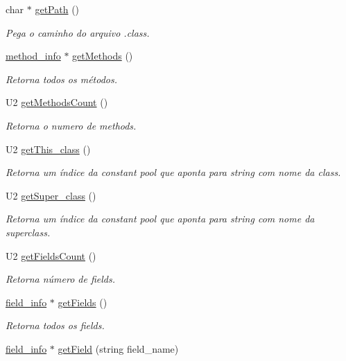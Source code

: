 \begin{DoxyCompactItemize}
char $\ast$ \hyperlink{classLeitor_a28757ad7042926102520d2f28387acfe}{get\+Path} ()
\begin{DoxyCompactList}\small\item\em Pega o caminho do arquivo .class. \end{DoxyCompactList}\item 
\hyperlink{structmethod__info}{method\+\_\+info} $\ast$ \hyperlink{classLeitor_aa08c48544276f3c849eb138576d9f1b3}{get\+Methods} ()
\begin{DoxyCompactList}\small\item\em Retorna todos os métodos. \end{DoxyCompactList}\item 
U2 \hyperlink{classLeitor_a1bf5bcc94ae930802de39077836d6566}{get\+Methods\+Count} ()
\begin{DoxyCompactList}\small\item\em Retorna o numero de methods. \end{DoxyCompactList}\item 
U2 \hyperlink{classLeitor_a96d06888c1e8d4a6516c5e5f36d49801}{get\+This\+\_\+class} ()
\begin{DoxyCompactList}\small\item\em Retorna um índice da constant pool que aponta para string com nome da class. \end{DoxyCompactList}\item 
U2 \hyperlink{classLeitor_ab70e078103dc971808b62ab08cbfb4fa}{get\+Super\+\_\+class} ()
\begin{DoxyCompactList}\small\item\em Retorna um índice da constant pool que aponta para string com nome da superclass. \end{DoxyCompactList}\item 
U2 \hyperlink{classLeitor_a59287cad03c19ca411b7befce0008870}{get\+Fields\+Count} ()
\begin{DoxyCompactList}\small\item\em Retorna número de fields. \end{DoxyCompactList}\item 
\hyperlink{structfield__info}{field\+\_\+info} $\ast$ \hyperlink{classLeitor_a32f5a9515e24523f3f4016141de5cc9d}{get\+Fields} ()
\begin{DoxyCompactList}\small\item\em Retorna todos os fields. \end{DoxyCompactList}\item 
\hyperlink{structfield__info}{field\+\_\+info} $\ast$ \hyperlink{classLeitor_a1c0eb678858e00efa9c18d63832d3dff}{get\+Field} (string field\+\_\+name)

\end{DoxyCompactItemize}
